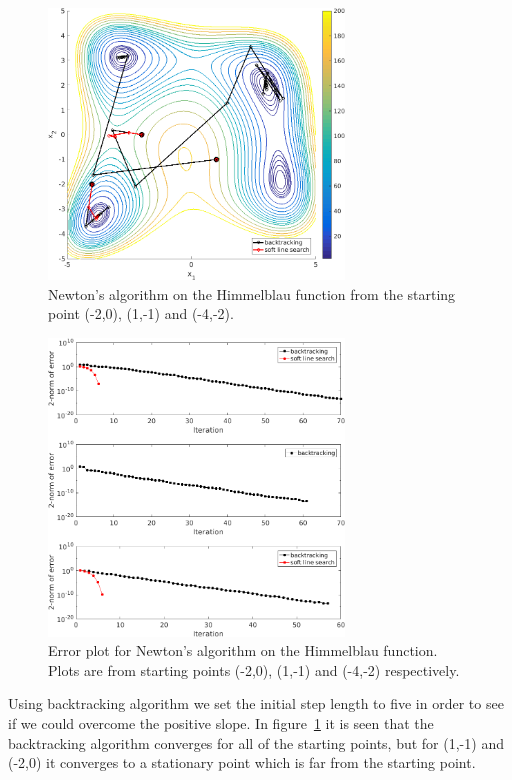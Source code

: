 \begin{figure}[htb]
\centering
\includegraphics[width=0.7\textwidth]{../img/newton}
\caption{Newton's algorithm on the Himmelblau function from the starting point (-2,0), (1,-1) and (-4,-2).}
\label{fig:newton}
\end{figure}

\begin{figure}[htb]
\centering
\includegraphics[width=0.7\textwidth]{../img/NewtonError}
\caption{Error plot for Newton's algorithm on the Himmelblau function. Plots are from starting points (-2,0), (1,-1) and (-4,-2) respectively.}
\label{fig:rateConvNewton}
\end{figure}

Using backtracking algorithm we set the initial step length to five in order to see if we could overcome the positive slope. In figure~\ref{fig:newton} it is seen that the backtracking algorithm converges for all of the starting points, but for (1,-1) and (-2,0) it converges to a stationary point which is far from the starting point. 

